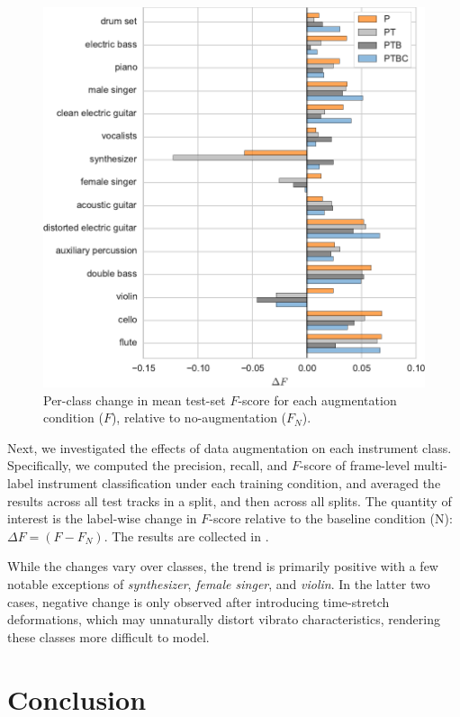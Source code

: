 \documentclass{article}
\begin{document}
\begin{figure}[t]
    \centering
    \includegraphics[width=\columnwidth]{figs/fscore-improvement}
    \caption{Per-class change in mean test-set $F$-score for each augmentation condition ($F$), relative to no-augmentation ($F_N$).\label{fscore}}
\end{figure}

Next, we investigated the effects of data augmentation on each instrument class.
Specifically, we computed the precision, recall, and $F$-score of frame-level multi-label
instrument classification under each training condition, and averaged the results across
all test tracks in a split, and then across all splits.
The quantity of interest is the label-wise change in $F$-score relative to the baseline
condition (N): $\Delta F = (F - F_N)$.
The results are collected in .

While the changes vary over classes, the trend is primarily positive
with a few notable exceptions of \emph{synthesizer}, \emph{female singer},
and \emph{violin}.
In the latter two cases, negative change is only observed after introducing time-stretch
deformations, which may unnaturally distort vibrato characteristics,
rendering these classes more difficult to model.


\section{Conclusion}




\end{document}
